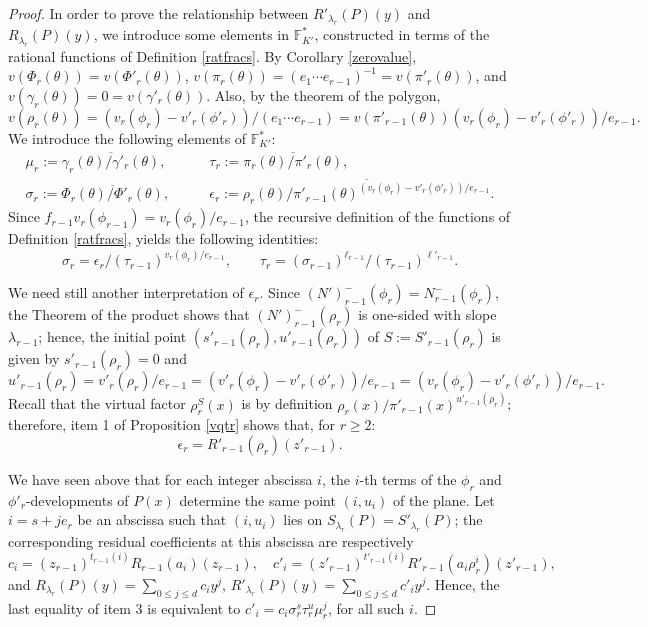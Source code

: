 \documentclass{amsart}
\def\as#1{\renewcommand\arraystretch{#1}}
\def\ff#1{\mathbb{F}_{#1}}
\def\ga{\gamma}
\def\la{\lambda}
\def\t{\theta}
\newcounter{cs}
\begin{document}
\begin{proof}
In order to prove the relationship between $R'_{\la_r}(P)(y)$ and $R_{\la_r}(P)(y)$, we introduce some elements in $\ff{K'}^*$, constructed in terms of the rational functions of Defi\-nition \ref{ratfracs}.
By Corollary \ref{zerovalue}, $v(\Phi_r(\t))=v(\Phi'_r(\t))$, $v(\pi_r(\t))=(e_1\cdots e_{r-1})^{-1}=v(\pi'_r(\t))$, and $v(\ga_r(\t))=0=v(\ga'_r(\t))$. Also, by the theorem of the polygon,
$$v(\rho_r(\t))=(v_r(\phi_r)-v'_r(\phi'_r))/(e_1\cdots e_{r-1})=v(\pi'_{r-1}(\t))(v_r(\phi_r)-v'_r(\phi'_r))/e_{r-1}.
$$
We introduce the following elements of $\ff{K'}^*$: 
$$\as{1.8}
\begin{array}{ll}
\mu_r:=\overline{\ga_r(\t)/\ga'_r(\t)},\qquad&
\tau_r:=\overline{\pi_r(\t)/\pi'_r(\t)},\\ 
\sigma_r:=\overline{\Phi_r(\t)/\Phi'_r(\t)},\qquad&
\epsilon_r:=\overline{\rho_r(\t)/\pi'_{r-1}(\t)^{(v_r(\phi_r)-v'_r(\phi'_r))/e_{r-1}}}.
\end{array}
$$Since $f_{r-1}v_r(\phi_{r-1})=v_r(\phi_r)/e_{r-1}$, the recursive definition of the functions of De\-finition \ref{ratfracs}, 
yields the following identities:
\begin{equation}\label{taur}
\sigma_r=\epsilon_r/(\tau_{r-1})^{v_r(\phi_r)/e_{r-1}},\qquad
\tau_r=(\sigma_{r-1})^{\ell_{r-1}}/(\tau_{r-1})^{\ell'_{r-1}}.
\end{equation}

We need still another interpretation of $\epsilon_r$. Since $(N')_{r-1}^-(\phi_r)=N_{r-1}^-(\phi_r)$, the Theorem of the product shows that $(N')_{r-1}^-(\rho_r)$ is one-sided with slope $\la_{r-1}$; hence,  the initial point $(s'_{r-1}(\rho_r),u'_{r-1}(\rho_r))$ of $S:=S'_{r-1}(\rho_r)$ is given by  $s'_{r-1}(\rho_r)=0$ and 
\begin{equation}\label{inirhor}
u'_{r-1}(\rho_r)=v'_r(\rho_r)/e_{r-1}=(v'_r(\phi_r)-v'_r(\phi'_r))/e_{r-1}=(v_r(\phi_r)-v'_r(\phi'_r))/e_{r-1}.
\end{equation}
Recall that the virtual factor $\rho_r^S(x)$ is by definition $\rho_r(x)/\pi'_{r-1}(x)^{u'_{r-1}(\rho_r)}$; therefore, item 1 of Proposition \ref{vqtr} shows that, for $r\ge 2$: 
\begin{equation}\label{epsilonr}\epsilon_r=R'_{r-1}(\rho_r)(z'_{r-1}).
\end{equation}

We have seen above that for each integer abscissa $i$, the $i$-th terms of the $\phi_r$ and $\phi'_r$-developments of $P(x)$ determine the same point $(i,u_i)$ of the plane. Let $i=s+je_r$ be an abscissa such that $(i,u_i)$ lies on  $S_{\la_r}(P)=S'_{\la_r}(P)$; the corresponding residual coefficients at this abscissa are respectively 
$$
c_i= (z_{r-1})^{t_{r-1}(i)}R_{r-1}(a_i)(z_{r-1}),\quad
c'_i= (z'_{r-1})^{t'_{r-1}(i)}R'_{r-1}(a_i\rho_r^i)(z'_{r-1}),
$$and $R_{\la_r}(P)(y)=\sum_{0\le j\le d}c_iy^j$, $R'_{\la_r}(P)(y)=\sum_{0\le j\le d}c'_iy^j$. Hence, the last equality of item 3 is equivalent to 
$c'_i=c_i\sigma_r^s\tau_r^u \mu_r^j$, for all such $i$.


\end{proof}
\end{document}
